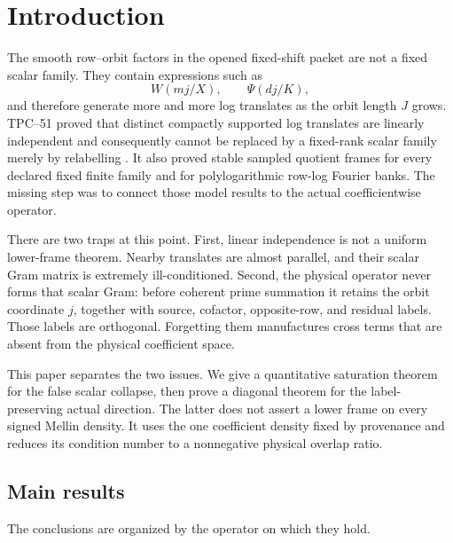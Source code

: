 \section{Introduction}
\label{sec:tpc52-introduction}

The smooth row--orbit factors in the opened fixed-shift packet are not a
fixed scalar family.  They contain expressions such as
\begin{equation}
 W(mj/X),\qquad \Psi(dj/K),
 \label{eq:tpc52-physical-shapes-preview}
\end{equation}
and therefore generate more and more log translates as the orbit length
\(J\) grows.  TPC--51 proved that distinct compactly supported log
translates are linearly independent and consequently cannot be replaced
by a fixed-rank scalar family merely by relabelling
\citep{WangTPC51}.  It also proved stable sampled quotient frames for
every declared fixed finite family and for polylogarithmic row-log
Fourier banks.  The missing step was to connect those model results to
the actual coefficientwise operator.

There are two traps at this point.  First, linear independence is not a
uniform lower-frame theorem.  Nearby translates are almost parallel,
and their scalar Gram matrix is extremely ill-conditioned.  Second, the
physical operator never forms that scalar Gram: before coherent prime
summation it retains the orbit coordinate \(j\), together with source,
cofactor, opposite-row, and residual labels.  Those labels are
orthogonal.  Forgetting them manufactures cross terms that are absent
from the physical coefficient space.

This paper separates the two issues.  We give a quantitative saturation
theorem for the false scalar collapse, then prove a diagonal theorem for
the label-preserving actual direction.  The latter does not assert a
lower frame on every signed Mellin density.  It uses the one coefficient
density fixed by provenance and reduces its condition number to a
nonnegative physical overlap ratio.

\subsection{Main results}

The conclusions are organized by the operator on which they hold.

